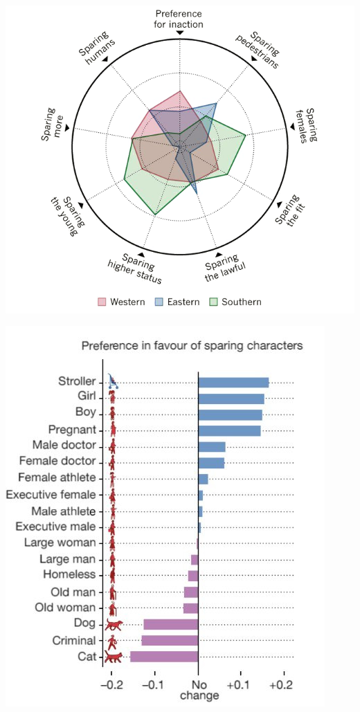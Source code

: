 \documentclass[aspectratio=169,x11names]{beamer}
\begin{document}
\begin{frame}
\begin{multicols}{2}
\begin{center}
\includegraphics[scale=1.25]{images/morals.png} 
\end{center}
\columnbreak
\pause
\begin{center}
\includegraphics[scale=1.45]{images/sparing} 
\end{center}
\end{multicols}
\end{frame}
\end{document}
